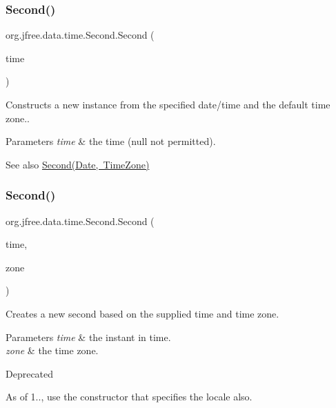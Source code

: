 \subsubsection{\texorpdfstring{Second()}{Second()}\hspace{0.1cm}{\footnotesize\ttfamily [4/6]}}
{\footnotesize\ttfamily org.\+jfree.\+data.\+time.\+Second.\+Second (\begin{DoxyParamCaption}\item[{Date}]{time }\end{DoxyParamCaption})}

Constructs a new instance from the specified date/time and the default time zone..


\begin{DoxyParams}{Parameters}
{\em time} & the time ({\ttfamily null} not permitted).\\
\hline
\end{DoxyParams}
\begin{DoxySeeAlso}{See also}
\mbox{\hyperlink{classorg_1_1jfree_1_1data_1_1time_1_1_second_a6349bf85897f77365176fd8c3e306bc2}{Second(\+Date, Time\+Zone)}} 
\end{DoxySeeAlso}
\mbox{\label{classorg_1_1jfree_1_1data_1_1time_1_1_second_a6349bf85897f77365176fd8c3e306bc2}} 
\subsubsection{\texorpdfstring{Second()}{Second()}\hspace{0.1cm}{\footnotesize\ttfamily [5/6]}}
{\footnotesize\ttfamily org.\+jfree.\+data.\+time.\+Second.\+Second (\begin{DoxyParamCaption}\item[{Date}]{time,  }\item[{Time\+Zone}]{zone }\end{DoxyParamCaption})}

Creates a new second based on the supplied time and time zone.


\begin{DoxyParams}{Parameters}
{\em time} & the instant in time. \\
\hline
{\em zone} & the time zone.\\
\hline
\end{DoxyParams}
\begin{DoxyRefDesc}{Deprecated}
\item[\mbox{\hyperlink{deprecated__deprecated000276}{Deprecated}}]As of 1.., use the constructor that specifies the locale also. \end{DoxyRefDesc}
\mbox{\label{classorg_1_1jfree_1_1data_1_1time_1_1_second_a37ddbb0efcd87f2f6a6bdce9df99ad81}} 

